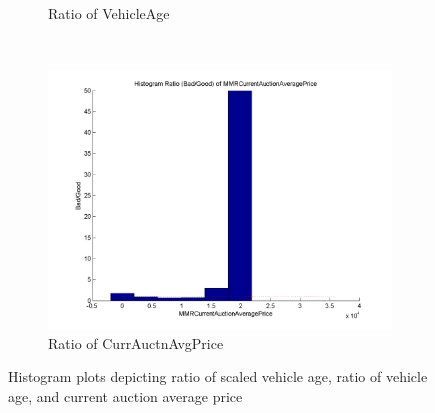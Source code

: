 \documentclass[paper=letter, fontsize=11pt]{scrartcl} %
\numberwithin{equation}{section} %
\begin{document}
\begin{figure}[!ht]
\begin{subfigure}[b]{0.3\textwidth}
                \caption{Ratio of VehicleAge}
                \label{fig:VehicleAge}
        \end{subfigure}
        ~ %
\begin{subfigure}[b]{0.3\textwidth}
					 \centering
\includegraphics[width=\textwidth]{figures/HistogramRatio_MMRCurrentAuctionAveragePrice.png}
                \caption{Ratio of CurrAuctnAvgPrice}
                \label{fig:MMRCurrentAuctionAveragePrice}
        \end{subfigure}
        \caption{Histogram plots depicting ratio of scaled vehicle age, ratio of vehicle age, and current auction average price}\label{fig:Histograms}
\end{figure}
\end{document}

